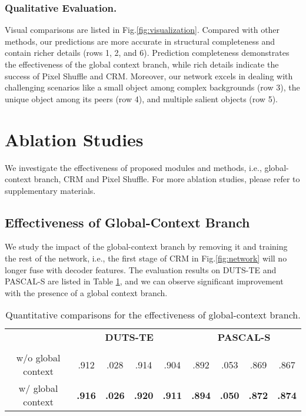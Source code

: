 \documentclass[letterpaper]{article} \usepackage{aaai22}  \usepackage{times}  \usepackage{helvet}  \usepackage{courier}  \usepackage[hyphens]{url}  \usepackage{graphicx} \urlstyle{rm} \def\UrlFont{\rm}  \usepackage{natbib}  \usepackage{caption} \DeclareCaptionStyle{ruled}{labelfont=normalfont,labelsep=colon,strut=off} \frenchspacing  \setlength{\pdfpagewidth}{8.5in}  \setlength{\pdfpageheight}{11in}  \usepackage{algorithm}
\begin{document}
\subsubsection{Qualitative Evaluation.}
Visual comparisons are listed in Fig.\ref{fig:visualization}. Compared with other methods, our predictions are more accurate in structural completeness and contain richer details (rows 1, 2, and 6). Prediction completeness demonstrates the effectiveness of the global context branch, while rich details indicate the success of Pixel Shuffle and CRM. Moreover, our network excels in dealing with challenging scenarios like a small object among complex backgrounds (row 3), the unique object among its peers (row 4), and multiple salient objects (row 5).

\vspace{-0.01\linewidth}
\section{Ablation Studies}
We investigate the effectiveness of proposed modules and methods, i.e., global-context branch, CRM and Pixel Shuffle. For more ablation studies, please refer to supplementary materials.
\vspace{-0.01\linewidth}

\subsection{Effectiveness of Global-Context Branch}
We study the impact of the global-context branch by removing it and training the rest of the network, i.e., the first stage of CRM in Fig.\ref{fig:network} will no longer fuse  with decoder features. The evaluation results on DUTS-TE and PASCAL-S are listed in Table \ref{table:GLC}, and we can observe significant improvement with the presence of a global context branch.
\begin{table}[!h]
\centering
\setlength\tabcolsep{1.25pt}
\caption{Quantitative comparisons for the effectiveness of global-context branch.}
\begin{tabular}{c|cccc|cccc} 
\hline
\hline
\multirow{2}{*}{} & \multicolumn{4}{c|}{\textbf{DUTS-TE}} & \multicolumn{4}{c}{\textbf{PASCAL-S}}  \\
& \textbf{} & \textbf{} & \textbf{} & \textbf{}
& \textbf{} & \textbf{} & \textbf{} & \textbf{}\\ 
\hline
w/o global context  & .912             & .028               & .914              & .904            & .892            & .053                 & .869            & .867          \\
w/ global context   &\textbf{.916}   &\textbf{.026}    &\textbf{.920}   &\textbf{.911}  &\textbf{.894} &\textbf{.050} &\textbf{.872} &\textbf{.874}    \\
\hline
\hline
\end{tabular}
\label{table:GLC}
\vspace{-0.04\linewidth}
\end{table}
\end{document}
